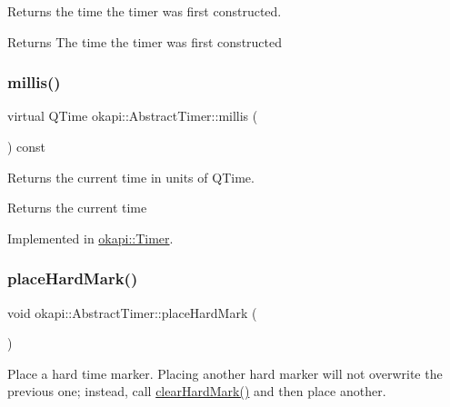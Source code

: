 Returns the time the timer was first constructed.

\begin{DoxyReturn}{Returns}
The time the timer was first constructed 
\end{DoxyReturn}
\mbox{\label{classokapi_1_1AbstractTimer_a6871e119f74d8b6a8c928244e837e762}} 
\subsubsection{\texorpdfstring{millis()}{millis()}}
{\footnotesize\ttfamily virtual Q\+Time okapi\+::\+Abstract\+Timer\+::millis (\begin{DoxyParamCaption}{ }\end{DoxyParamCaption}) const\hspace{0.3cm}{\ttfamily [pure virtual]}}

Returns the current time in units of Q\+Time.

\begin{DoxyReturn}{Returns}
the current time 
\end{DoxyReturn}


Implemented in \mbox{\hyperlink{classokapi_1_1Timer_aca51b21d6302021cd24b49b64648c13c}{okapi\+::\+Timer}}.

\mbox{\label{classokapi_1_1AbstractTimer_a177197191296d0d7a5c49c86d5a514fc}} 
\subsubsection{\texorpdfstring{placeHardMark()}{placeHardMark()}}
{\footnotesize\ttfamily void okapi\+::\+Abstract\+Timer\+::place\+Hard\+Mark (\begin{DoxyParamCaption}{ }\end{DoxyParamCaption})\hspace{0.3cm}{\ttfamily [virtual]}}

Place a hard time marker. Placing another hard marker will not overwrite the previous one; instead, call \mbox{\hyperlink{classokapi_1_1AbstractTimer_af462e941170d1659dd04ab9d1ead3968}{clear\+Hard\+Mark()}} and then place another. \mbox{\label{classokapi_1_1AbstractTimer_a34c9be79510d23d702fd22188d542ec9}} 
